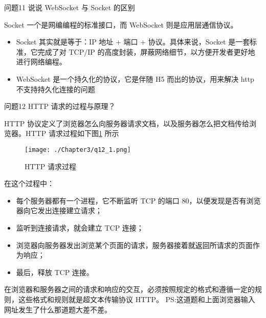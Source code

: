 \documentclass[cn,11pt,color=blue,lang=cn]{elegantbook}
\begin{document}
\begin{custom}{问题11}
说说 WebSocket 与 Socket 的区别
\end{custom}
\begin{solution}
Socket 一个是网编编程的标准接口，而 WebSocket 则是应用层通信协议。

\begin{itemize}
	\item Socket 其实就是等于：IP 地址 + 端口 + 协议。具体来说，Socket 是一套标准，它完成了对 TCP/IP 的高度封装，屏蔽网络细节，以方便开发者更好地进行网络编程。
	\item WebSocket 是一个持久化的协议，它是伴随 H5 而出的协议，用来解决 http 不支持持久化连接的问题
\end{itemize}

\end{solution}

\begin{custom}{问题12}
HTTP 请求的过程与原理？
\end{custom}

\begin{solution}
HTTP 协议定义了浏览器怎么向服务器请求文档，以及服务器怎么把文档传给浏览器。HTTP 请求过程如下图\ref{fig12_1} 所示
\begin{figure}[!h]
\centering
\texttt{[image: ./Chapter3/q12\_1.png]}
\caption{HTTP 请求过程}
\label{fig12_1}
\end{figure}

在这个过程中：
\begin{itemize}
	\item 每个服务器都有一个进程，它不断监听 TCP 的端口 80，以便发现是否有浏览器向它发出连接建立请求；
	\item 监听到连接请求，就会建立 TCP 连接；
	\item 浏览器向服务器发出浏览某个页面的请求，服务器接着就返回所请求的页面作为响应；
	\item 最后，释放 TCP 连接。
\end{itemize}
在浏览器和服务器之间的请求和响应的交互，必须按照规定的格式和遵循一定的规则，这些格式和规则就是超文本传输协议 HTTP。 PS:这道题和上面浏览器输入网址发生了什么那道题大差不差。
\end{solution}
\end{document}
